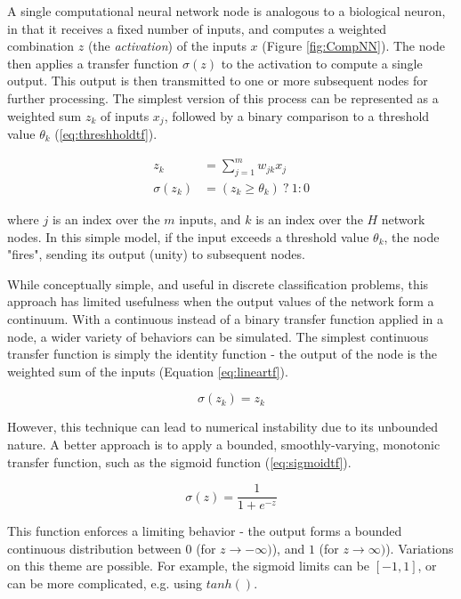 \documentclass{article}
\begin{document}
A single computational neural network node is analogous to a biological neuron, in that it receives a fixed number of inputs, and computes a weighted combination $z$ (the \emph{activation}) of the inputs $x$ (Figure \ref{fig:CompNN}). The node then applies a transfer function $\sigma(z)$ to the activation to compute a single output. This output is then transmitted to one or more subsequent nodes for further processing. The simplest version of this process can be represented as a weighted sum $z_k$ of inputs $x_j$, followed by a binary comparison to a threshold value $\theta_k$ (\ref{eq:threshholdtf}).

\begin{equation}
\begin{split}
  z_k &= \sum_{j=1}^m w_{jk} x_j \\
  \sigma(z_k) &= (z_k \ge \theta_k)\ ?\ 1:0
\end{split}
\label{eq:threshholdtf}
\end{equation}

\noindent where $j$ is an index over the $m$ inputs, and $k$ is an index over the $H$ network nodes. In this simple model, if the input exceeds a threshold value $\theta_k$, the node "fires", sending its output (unity) to subsequent nodes.

While conceptually simple, and useful in discrete classification problems, this approach has limited usefulness when the output values of the network form a continuum. With a continuous instead of a binary transfer function applied in a node, a wider variety of behaviors can be simulated. The simplest continuous transfer function is simply the identity function - the output of the node is the weighted sum of the inputs (Equation \ref{eq:lineartf}).

\begin{equation}
  \sigma(z_k) = z_k
  \label{eq:lineartf}
\end{equation}

\noindent However, this technique can lead to numerical instability due to its unbounded nature. A better approach is to apply a bounded, smoothly-varying, monotonic transfer function, such as the sigmoid function (\ref{eq:sigmoidtf}).

\begin{equation}
  \sigma(z) = \frac {1} {1 + e^{-z}}
  \label{eq:sigmoidtf}
\end{equation}

\noindent This function enforces a limiting behavior - the output forms a bounded continuous distribution between $0$ (for $z \rightarrow -\infty)$), and $1$ (for  $z \rightarrow \infty)$). Variations on this theme are possible. For example, the sigmoid limits can be $[-1,1]$, or can be more complicated, e.g. using $tanh()$.
\end{document}
